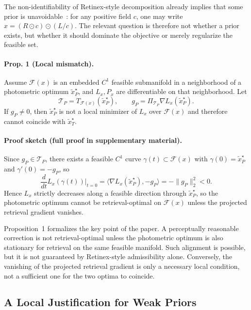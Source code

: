 \documentclass[sigconf,screen,review,anonymous]{acmart}
\begin{document}
The non-identifiability of Retinex-style decomposition already implies that
some prior is unavoidable~\cite{land1971lightness,wei2018retinexnet,cai2023retinexformer}:
for any positive field $c$, one may write
$x = (R \odot c) \odot (L / c)$.
The relevant question is therefore not whether a prior exists, but whether it
should dominate the objective or merely regularize the feasible set.

\paragraph{Prop. 1 (Local mismatch).}
Assume $\mathcal{F}(x)$ is an embedded $C^1$ feasible submanifold in a neighborhood of a
photometric optimum $\tilde{x}_P^{\star}$, and $L_x,P_x$ are differentiable on
that neighborhood.
Let
\[
  \mathcal{T}_P = T_{\mathcal{F}(x)}(\tilde{x}_P^{\star}),
  \qquad
  g_P = \Pi_{\mathcal{T}_P}\nabla L_x(\tilde{x}_P^{\star}).
\]
If $g_P \neq 0$, then $\tilde{x}_P^{\star}$ is not a local minimizer of
$L_x$ over $\mathcal{F}(x)$ and therefore cannot coincide with
$\tilde{x}_T^{\star}$.

\paragraph{Proof sketch (full proof in supplementary material).}
Since $g_P \in \mathcal{T}_P$, there exists a feasible $C^1$ curve
$\gamma(t) \subset \mathcal{F}(x)$ with $\gamma(0)=\tilde{x}_P^{\star}$ and
$\gamma'(0)=-g_P$, so
\[
  \frac{d}{dt}L_x(\gamma(t))\Big|_{t=0}
  =
  \langle \nabla L_x(\tilde{x}_P^{\star}), -g_P \rangle
  =
  -\|g_P\|_2^2 < 0.
\]
Hence $L_x$ strictly decreases along a feasible direction through
$\tilde{x}_P^{\star}$, so the photometric optimum cannot be retrieval-optimal on
$\mathcal{F}(x)$ unless the projected retrieval gradient vanishes.

Proposition~1 formalizes the key point of the paper.
A perceptually reasonable correction is not retrieval-optimal unless the
photometric optimum is also stationary for retrieval on the same feasible
manifold.
Such alignment is possible, but it is not guaranteed by Retinex-style
admissibility alone. Conversely, the vanishing of the projected retrieval
gradient is only a necessary local condition, not a sufficient one for the two
optima to coincide.

\subsection{A Local Justification for Weak Priors}
\end{document}
